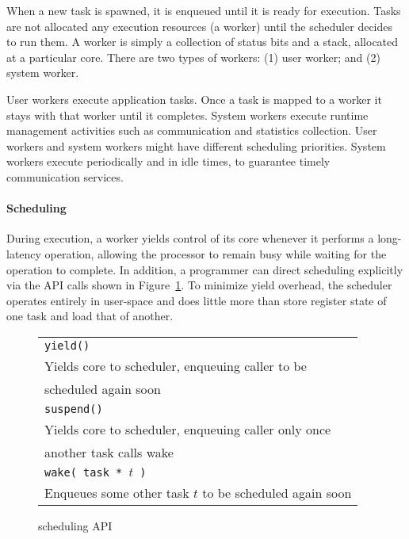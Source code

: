 When a new task is spawned, it is enqueued until it is ready for execution.
Tasks are not allocated any execution resources (a worker) until the scheduler
decides to run them. A worker is simply a collection of status bits and a
stack, allocated at a particular core. There are two types of workers: (1) user worker; and (2) system worker. 

User workers execute application tasks. Once a task is mapped to a worker it
stays with that worker until it completes. System workers execute runtime
management activities such as communication and statistics collection. User
workers and system workers might have different scheduling priorities. System
workers execute periodically and in idle times, to guarantee timely
communication services.

\paragraph{Scheduling} 

During execution, a worker yields control of its core whenever it performs a
long-latency operation, allowing the processor to remain busy while waiting
for the operation to complete. In addition, a programmer can direct scheduling
explicitly via the \Grappa API calls shown in Figure~\ref{fig:scheduling}. To
minimize yield overhead, the \Grappa scheduler operates entirely in user-space
and does little more than store register state of one task and load that of
another.

\begin{figure}[htbp]
  \begin{center}
	\begin{tabular}{l}
    \texttt{\scriptsize yield() } \\
      Yields core to scheduler, enqueuing caller to be \\ scheduled again soon \\
    \texttt{\scriptsize suspend() }  \\
      Yields core to scheduler, enqueuing caller only once \\ another task calls wake \\
    \texttt{\scriptsize wake( task * $t$ ) } \\
      Enqueues some other task $t$ to be scheduled again soon \\
	\end{tabular}
    \begin{minipage}{0.95\columnwidth}
      \caption{\label{fig:scheduling} \Grappa scheduling API } 
    \end{minipage}
  \end{center}
\end{figure}

